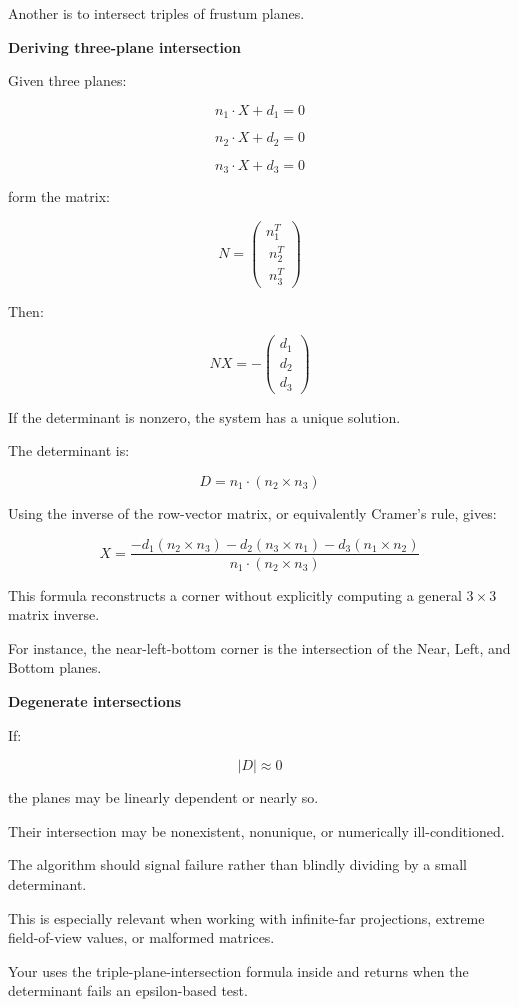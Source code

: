Another is to intersect triples of frustum planes.

\textbf{Deriving three-plane intersection}

Given three planes:

\[
n_1\cdot X+d_1=0
\]

\[
n_2\cdot X+d_2=0
\]

\[
n_3\cdot X+d_3=0
\]

form the matrix:

\[
N= \begin{pmatrix} n_1^T\\\ n_2^T\\\ n_3^T \end{pmatrix}
\]

Then:

\[
NX= -\begin{pmatrix} d_1\\ d_2\\ d_3 \end{pmatrix}
\]

If the determinant is nonzero, the system has a unique solution.

The determinant is:

\[
D=n_1\cdot(n_2\times n_3)
\]

Using the inverse of the row-vector matrix, or equivalently Cramer's rule, gives:

\[
\boxed{ X= \frac{ -d_1(n_2\times n_3) -d_2(n_3\times n_1) -d_3(n_1\times n_2) }{ n_1\cdot(n_2\times n_3) } }
\]

This formula reconstructs a corner without explicitly computing a general \(3\times3\) matrix inverse.

For instance, the near-left-bottom corner is the intersection of the Near, Left, and Bottom planes.

\textbf{Degenerate intersections}

If:

\[
|D|\approx0
\]

the planes may be linearly dependent or nearly so.

Their intersection may be nonexistent, nonunique, or numerically ill-conditioned.

The algorithm should signal failure rather than blindly dividing by a small determinant.

This is especially relevant when working with infinite-far projections, extreme field-of-view values, or malformed matrices.

Your  uses the triple-plane-intersection formula inside  and returns  when the determinant fails an epsilon-based test.

